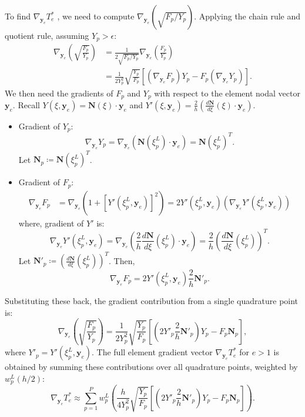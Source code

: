 \documentclass[11pt]{article}
\begin{document}
To find $ \nabla_{\mathbf{y}_e} T_e^* $ , we need to compute \( \nabla_{\mathbf{y}_e} \left( \sqrt{F_p / Y_p} \right) \). Applying the chain rule and quotient rule, assuming \( Y_p > \epsilon \):
\begin{align*}
    \nabla_{\mathbf{y}_e} \left( \sqrt{\frac{F_p}{Y_p}} \right) &= \frac{1}{2 \sqrt{F_p / Y_p}} \nabla_{\mathbf{y}_e} \left( \frac{F_p}{Y_p} \right) \\
    &= \frac{1}{2 Y_p^2} \sqrt{\frac{Y_p}{F_p}} \left[ (\nabla_{\mathbf{y}_e} F_p) Y_p - F_p (\nabla_{\mathbf{y}_e} Y_p) \right].
\end{align*}
We then need the gradients of \( F_p \) and \( Y_p \) with respect to the element nodal vector \( \mathbf{y}_e \). Recall \( Y(\xi, \mathbf{y}_e) = \mathbf{N}(\xi) \cdot \mathbf{y}_e \) and \( Y'(\xi, \mathbf{y}_e) = \frac{2}{h} (\frac{d\mathbf{N}}{d\xi}(\xi) \cdot \mathbf{y}_e) \). 
\begin{itemize}
    \item Gradient of \( Y_p \): 
    \[ \nabla_{\mathbf{y}_e} Y_p = \nabla_{\mathbf{y}_e} (\mathbf{N}(\xi_p^L) \cdot \mathbf{y}_e) = \mathbf{N}(\xi_p^L)^T. \]
    Let \( \mathbf{N}_p \coloneqq \mathbf{N}(\xi_p^L)^T \).
    \item Gradient of \( F_p \): 
    \begin{align*}
        \nabla_{\mathbf{y}_e} F_p &= \nabla_{\mathbf{y}_e} (1 + [Y'(\xi_p^L, \mathbf{y}_e)]^2) = 2 Y'(\xi_p^L, \mathbf{y}_e) (\nabla_{\mathbf{y}_e} Y'(\xi_p^L, \mathbf{y}_e))
    \end{align*}
    where, gradient of \( Y' \) is:
    \[ \nabla_{\mathbf{y}_e} Y'(\xi_p^L, \mathbf{y}_e) = \nabla_{\mathbf{y}_e} \left( \frac{2}{h} \frac{d\mathbf{N}}{d\xi}(\xi_p^L) \cdot \mathbf{y}_e \right) = \frac{2}{h} \left(\frac{d\mathbf{N}}{d\xi}(\xi_p^L)\right)^T. \]
    Let \( \mathbf{N}'_p \coloneqq (\frac{d\mathbf{N}}{d\xi}(\xi_p^L))^T \). Then,
    \[ \nabla_{\mathbf{y}_e} F_p = 2 Y'(\xi_p^L, \mathbf{y}_e) \frac{2}{h} \mathbf{N}'_p. \]
\end{itemize}

Substituting these back, the gradient contribution from a single quadrature point is:
\[ 
    \nabla_{\mathbf{y}_e} \left( \sqrt{\frac{F_p}{Y_p}} \right) = \frac{1}{2 Y_p^2} \sqrt{\frac{Y_p}{F_p}} \left[ \left( 2 Y'_p \frac{2}{h} \mathbf{N}'_p \right) Y_p - F_p \mathbf{N}_p \right],
\]
where \( Y'_p = Y'(\xi_p^L, \mathbf{y}_e) \). The full element gradient vector \( \nabla_{\mathbf{y}_e} T_e^* \) for \( e >1 \) is obtained by summing these contributions over all quadrature points, weighted by \( w_p^L (h/2) \):
\begin{equation}
    \nabla_{\mathbf{y}_e} T_e^* \approx \sum_{p=1}^{P} w_{p}^{L} \left( \frac{h}{4 Y_p^2} \sqrt{\frac{Y_p}{F_p}} \left[ \left( 2 Y'_p \frac{2}{h} \mathbf{N}'_p \right) Y_p - F_p \mathbf{N}_p \right] \right). \label{eq:gradTe}
\end{equation}
\end{document}
